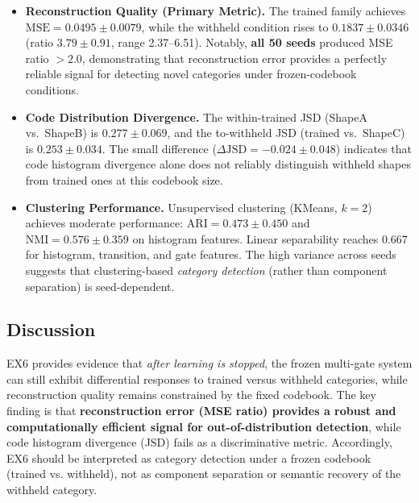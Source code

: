 \documentclass{article}
\begin{document}
\begin{itemize}
    \item \textbf{Reconstruction Quality (Primary Metric).}
    The trained family achieves $\mathrm{MSE} = 0.0495 \pm 0.0079$, while the withheld condition rises to $0.1837 \pm 0.0346$ (ratio $3.79 \pm 0.91$, range 2.37--6.51).
    Notably, \textbf{all 50 seeds} produced MSE ratio $> 2.0$, demonstrating that reconstruction error provides a perfectly reliable signal for detecting novel categories under frozen-codebook conditions.

    \item \textbf{Code Distribution Divergence.}
    The within-trained JSD (ShapeA vs.\ ShapeB) is $0.277 \pm 0.069$, and the to-withheld JSD (trained vs.\ ShapeC) is $0.253 \pm 0.034$.
    The small difference ($\Delta\mathrm{JSD} = -0.024 \pm 0.048$) indicates that code histogram divergence alone does not reliably distinguish withheld shapes from trained ones at this codebook size.

    \item \textbf{Clustering Performance.}
    Unsupervised clustering (KMeans, $k=2$) achieves moderate performance: $\mathrm{ARI} = 0.473 \pm 0.450$ and $\mathrm{NMI} = 0.576 \pm 0.359$ on histogram features.
    Linear separability reaches $0.667$ for histogram, transition, and gate features.
    The high variance across seeds suggests that clustering-based \emph{category detection} (rather than component separation) is seed-dependent.
\end{itemize}

\subsection{Discussion}

EX6 provides evidence that \emph{after learning is stopped}, the frozen multi-gate system can still exhibit differential responses to trained versus withheld categories, while reconstruction quality remains constrained by the fixed codebook.
The key finding is that \textbf{reconstruction error (MSE ratio) provides a robust and computationally efficient signal for out-of-distribution detection}, while code histogram divergence (JSD) fails as a discriminative metric. Accordingly, EX6 should be interpreted as category detection under a frozen codebook (trained vs. withheld), not as component separation or semantic recovery of the withheld category.
\end{document}
